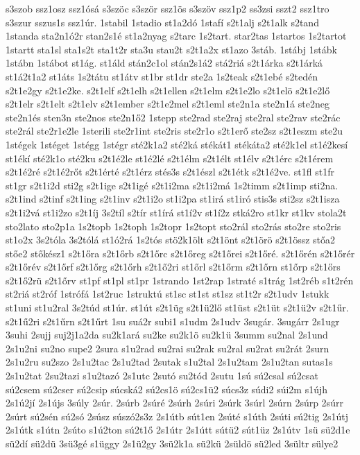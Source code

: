 {s3szob
ssz1osz
ssz1ósá
s3szöc
s3ször
ssz1ös
s3szöv
ssz1p2
ss3zsi
sszt2
ssz1tro
s3szur
sszus1s
ssz1úr.
1stabil
1stadio
st1a2dó
1stafí
s2t1alj
s2t1alk
s2tand
1standa
sta2n1ó2r
stan2s1é
st1a2nyag
s2tarc
1s2tart.
star2tas
1startos
1s2tartot
1startt
sta1sl
sta1s2t
sta1t2r
sta3u
stau2t
s2t1a2x
st1azo
3stáb.
1stábj
1stábk
1stábn
1stábot
st1ág.
st1áld
stán2c1ol
stán2s1á2
stá2riá
s2t1árka
s2t1árká
st1á2t1a2
st1áts
1s2tátu
st1átv
st1br
st1dr
ste2a
1s2teak
s2t1ebé
s2tedén
s2t1e2gy
s2t1e2ke.
s2t1elf
s2t1elh
s2t1ellen
s2t1elm
s2t1e2lo
s2t1elö
s2t1e2lő
s2t1elr
s2t1elt
s2t1elv
s2t1ember
s2t1e2mel
s2t1eml
ste2n1a
ste2n1á
ste2neg
ste2n1és
sten3n
ste2nos
ste2n1ő2
1stepp
ste2rad
ste2raj
ste2ral
ste2rav
ste2rác
ste2rál
ste2r1e2le
1sterili
ste2r1int
ste2ris
ste2r1o
s2t1erő
ste2sz
s2t1eszm
ste2u
1stégek
1stéget
1stégg
1stégr
sté2k1a2
sté2ká
stékát1
stékáta2
sté2k1el
st1é2kesí
st1ékí
sté2k1o
sté2ku
s2t1é2le
st1é2lé
s2t1élm
s2t1élt
st1élv
s2t1érc
s2t1érem
s2t1é2ré
s2t1é2rőt
s2t1érté
s2t1érz
stés3s
s2t1észl
s2t1étk
s2t1é2ve.
st1fl
st1fr
st1gr
s2t1i2d
sti2g
s2t1ige
s2t1igé
s2t1i2ma
s2t1i2má
1s2timm
s2t1imp
sti2na.
s2t1ind
s2tinf
s2t1ing
s2t1inv
s2t1i2o
st1i2pa
st1irá
st1iró
stis3s
sti2sz
s2t1isza
s2t1i2vá
st1i2zo
s2t1íj
3s2tíl
s2tír
st1írá
st1í2v
st1í2z
stká2ro
st1kr
st1kv
stola2t
sto2lato
sto2p1a
1s2topb
1s2toph
1s2topr
1s2topt
sto2rál
sto2rás
sto2re
sto2ris
st1o2x
3s2tóla
3s2tólá
st1ó2rá
1s2tós
stö2k1ölt
s2t1önt
s2t1örö
s2t1össz
stőa2
stőe2
stőkész1
s2t1őra
s2t1őrb
s2t1őrc
s2t1őreg
s2t1őrei
s2t1őré.
s2t1őrén
s2t1őrér
s2t1őrév
s2t1őrf
s2t1őrg
s2t1őrh
s2t1ő2ri
st1őrl
s2t1őrm
s2t1őrn
st1őrp
s2t1őrs
s2t1ő2rü
s2t1őrv
st1pf
st1pl
st1pr
1strando
1st2rap
1straté
s1trág
1st2réb
s1t2rén
st2riá
st2róf
1strófá
1st2ruc
1struktú
st1sc
st1st
st1sz
st1t2r
s2t1udv
1stukk
st1uni
st1u2ral
3s2túd
st1úr.
st1út
s2t1üg
s2t1ü2lő
st1üst
s2t1üt
s2t1ü2v
s2t1űr.
s2t1ű2ri
s2t1űrn
s2t1űrt
1su
suá2r
subi1
s1udm
2s1udv
3sugár.
3sugárr
2s1ugr
3suhi
2sujj
suj2j1a2da
su2k1ará
su2ke
su2k1ö
su2k1ü
3summ
su2nal
2s1und
2s1u2ni
su2no
supe2
2sura
s1u2rad
su2rai
su2rak
su2ral
su2rat
su2rát
2surn
2s1u2ru
su2szo
2s1u2tac
2s1u2tad
2sutak
s1u2tal
2s1u2tam
2s1u2tan
sutas1s
2s1u2tat
2su2tazi
s1u2tazó
2s1utc
2sutó
su2tód
2sutu
1sú
sú2csal
sú2csat
sú2csem
sú2cser
sú2csip
súcská2
sú2cs1ö
sú2cs1ü2
súcs3z
súdi2
súi2m
s1újh
2s1ú2jí
2s1újs
3súly
2súr.
2súrb
2súré
2súrh
2súri
2súrk
3súrl
2súrn
2súrp
2súrr
2súrt
sú2sén
sú2só
2súsz
súszó2s3z
2s1útb
sút1en
2súté
s1úth
2súti
sú2tig
2s1útj
2s1útk
s1útn
2súto
s1ú2ton
sú2t1ő
2s1útr
2s1útt
sútü2
sút1üz
2s1útv
1sü
sü2d1e
sü2dí
sü2dü
3sü3gé
s1üggy
2s1ü2gy
3sü2k1a
sü2kü
2süldö
sü2led
3sültr
sülye2
}
